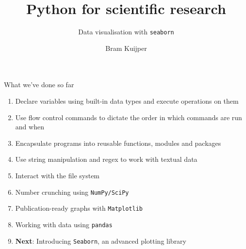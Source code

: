 \documentclass[xcolor=table]{beamer}
\title[Python for scientific research]{Python for scientific research}
\subtitle{Data visualisation with \texttt{seaborn}}
\author{Bram Kuijper}
\institute[]{University of Exeter, Penryn Campus, UK}
\begin{document}
\begin{frame}
\titlepage
\end{frame}

\begin{frame}{What we've done so far}

	\begin{enumerate}
		\item Declare variables using built-in data types and execute operations
		on them
		\item Use flow control commands to dictate the order in which commands are run
		and when
		\item Encapsulate programs into reusable functions, modules and packages
		\item Use string manipulation and regex to work with textual data
        \item Interact with the file system
		\item Number crunching using \texttt{NumPy/SciPy}
		\item Publication-ready graphs with \texttt{Matplotlib}
        \item Working with data using \texttt{pandas}
		\item \textbf{Next}: Introducing \texttt{Seaborn}, an advanced plotting library
	\end{enumerate}

\end{frame}
\end{document}
